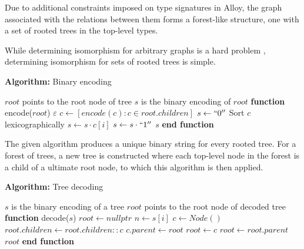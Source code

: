 \documentclass[conference]{IEEEtran}
\begin{document}
    Due to additional constraints imposed on type signatures in Alloy, the graph associated with the relations between them forms a forest-like structure, one with a set of rooted trees \cite{jackson-reference}
    in the top-level types.
    
    While determining isomorphism for arbitrary graphs is a hard problem \cite{graph-isomorphism}, determining isomorphism for sets of rooted trees is simple.

    \newcommand{\FUNCTION}[2]{\STATE \textbf{function} #1(#2)}
    \newcommand{\ENDFUNCTION}{\STATE \textbf{end function}}

    \begin{center}
        \textbf{Algorithm:} Binary encoding
        \end{center}
        \begin{algorithmic}[1]  %
        \REQUIRE $root$ points to the root node of tree
        \ENSURE $s$ is the binary encoding of $root$
        \FUNCTION{encode}{$root$}
            \RETURN $\varepsilon$
        \ENDIF 
        \STATE $c \gets [encode(c) : c \in root.children]$
        \STATE $s \gets ``0''$
        \STATE Sort $c$ lexicographically
        \STATE $s \gets s \cdot c[i]$
        \ENDFOR
        \STATE $s \gets s \cdot ``1''$
        \RETURN $s$
        \ENDFUNCTION
        \end{algorithmic}

The given algorithm produces a unique binary string for every rooted tree. For a forest of trees, a new tree is constructed where each top-level node in the forest is a child of a ultimate root node, to which this algorithm is then applied.

\begin{center}
    \textbf{Algorithm:} Tree decoding
    \end{center}
    \begin{algorithmic}[1]  %
    \ENSURE $s$ is the binary encoding of a tree
    \REQUIRE $root$ points to the root node of decoded tree
    \FUNCTION{decode}{$s$}
    \STATE $root \gets nullptr$
        \STATE $n \gets s[i]$
        \STATE $c \gets Node()$
            \STATE $root.children \gets root.children::c$
        \ENDIF
        \STATE $c.parent \gets root$
        \STATE $root \gets c$
        \ELSE
        \STATE $root \gets root.parent$
        \ENDIF
    \ENDFOR
    \RETURN $root$
    \ENDFUNCTION
    \end{algorithmic}
\end{document}
